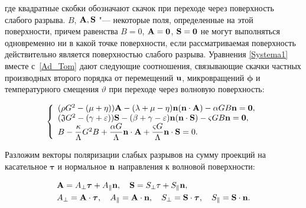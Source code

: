 где квадратные скобки обозначают скачок при переходе через поверхность слабого разрыва. $B$, $\bf{A, S}$ "--- некоторые поля, определенные на этой поверхности, причем равенства $B = 0$, $\bf{A = 0}$, ${\bf S = 0}$ не могут выполняться одновременно ни в какой точке поверхности, если рассматриваемая поверхность действительно является поверхностью слабого разрыва. Уравнения \eqref{Systema1} вместе с~\eqref{Ad_Tom} дают следующие соотношения, связывающие скачки частных производных второго порядка от  перемещений  ${\bf u}$, микровращений ${\boldsymbol\phi}$ и температурного смещения $\vartheta$ при переходе через волновую поверхность:

\begin{equation}\label{sys_break}

\left\{ {{\begin{array}{l}

(\rho G^2- (\mu+ \eta)) {\bf A}-(\lambda + \mu - \eta ){\bf n} ({\bf n}\cdot {\bf A})-\alpha G B {\bf n}  =\bf{ 0},\\

({\mathfrak J} G^2- (\gamma+ \varepsilon)) {\bf S}-(\beta + \gamma - \varepsilon ){\bf n} ( {\bf n} \cdot {\bf S})-\varsigma G B {\bf n} =\bf{ 0}, \\

 B - \dfrac{\kappa}{\Lambda}G^2 B+ \dfrac{\alpha G}{\Lambda}{\bf n} \cdot {\bf A} + \dfrac{\varsigma G}{\Lambda} {\bf n} \cdot {\bf S}=0. \\

\end{array} }} \right.

\end{equation}



Разложим векторы поляризации слабых разрывов на сумму проекций на касательное $\boldsymbol{\tau}$ и нормальное ${\bf n}$ направления к волновой поверхности:

\begin{equation}\label{sep}

\begin{aligned}

&{\bf A}=A_{\perp} {\boldsymbol \tau} + A_\parallel {\bf n}, \quad {\bf S}=S_{\perp} {\bf \tau} + S_\parallel {\bf n},\\

&A_{\perp}={\bf A}\cdot {\boldsymbol \tau},\quad A_\parallel={\bf A}\cdot {\bf n},\quad S_{\perp}={\bf S}\cdot {\boldsymbol \tau},\quad S_\parallel={\bf S}\cdot {\bf n}.

\end{aligned}

\end{equation}

